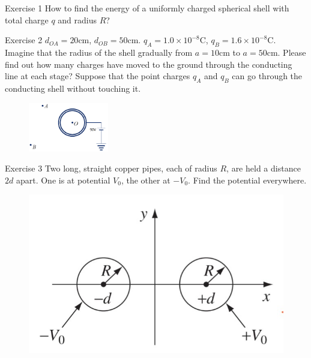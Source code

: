 \documentclass{beamer}
\begin{document}
\begin{frame}{Exercise 1}
    How to find the energy of a uniformly charged spherical shell with total charge $q$ and radius $R$?
\end{frame}

\begin{frame}{Exercise 2}
    $d_{OA} = 20 \mathrm{cm}$, $d_{OB} = 50 \mathrm{cm}$. $q_A = 1.0\times 10^{-8} \mathrm{C}$, 
    $q_B = 1.6 \times 10^{-8} \mathrm{C}$.
    Imagine that the radius of the shell gradually from $a=10\mathrm{cm}$ to $a=50\mathrm{cm}$. Please 
    find out how many charges have moved to the ground through the conducting line at each stage? Suppose 
    that the point charges $q_A$ and $q_B$ can go through the conducting shell without touching it.
    \vspace{.5em}
    \begin{figure}[H]
        \centering
        \includegraphics[width=3.5cm]{Images/m_of_image.png}
    \end{figure}
\end{frame}

\begin{frame}{Exercise 3}
    Two long, straight copper pipes, each of radius $R$, are held a distance $2d$ apart. One is at potential $V_0$, the other at $- V_0$. Find the potential everywhere.
    \begin{figure}[htbp]
        \centering
        \includegraphics{Images/e3.jpg}
    \end{figure}
\end{frame}
\end{document}
